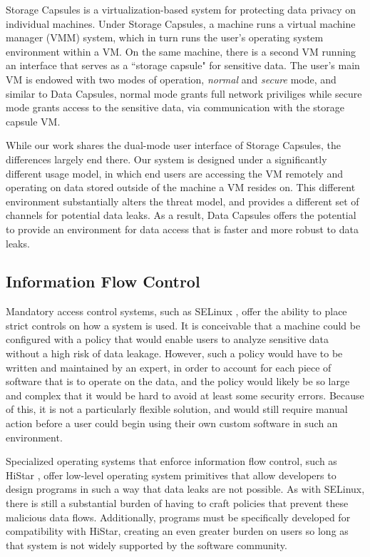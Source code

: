 \documentclass{acm_proc_article-sp}
\begin{document}
Storage Capsules \cite{capsules-borders} is a virtualization-based system for
protecting data privacy on individual machines.  Under Storage Capsules, a
machine runs a virtual machine manager (VMM) system, which in turn runs the
user's operating system environment within a VM.  On the same machine, there is
a second VM running an interface that serves as a ``storage capsule" for
sensitive data.  The user's main VM is endowed with two modes of operation,
\emph{normal} and \emph{secure} mode, and similar to Data Capsules, normal mode
grants full network priviliges while secure mode grants access to the sensitive
data, via communication with the storage capsule VM.

While our work shares the dual-mode user interface of Storage Capsules, the
differences largely end there.  Our system is designed under a significantly
different usage model, in which end users are accessing the VM remotely and
operating on data stored outside of the machine a VM resides on. This different
environment substantially alters the threat model, and provides a different set
of channels for potential data leaks.  As a result, Data Capsules offers the
potential to provide an environment for data access that is faster and more
robust to data leaks.

\subsection{Information Flow Control}

Mandatory access control systems, such as SELinux \cite{selinux}, offer the
ability to place strict controls on how a system is used.  It is conceivable
that a machine could be configured with a policy that would enable users to
analyze sensitive data without a high risk of data leakage.  However, such a
policy would have to be written and maintained by an expert, in order to account
for each piece of software that is to operate on the data, and the policy would
likely be so large and complex that it would be hard to avoid at least some
security errors.  Because of this, it is not a particularly flexible solution,
and would still require manual action before a user could begin using their own
custom software in such an environment.

Specialized operating systems that enforce information flow control, such as
HiStar \cite{histar}, offer low-level operating system primitives that allow
developers to design programs in such a way that data leaks are not possible.
As with SELinux, there is still a substantial burden of having to craft policies
that prevent these malicious data flows.  Additionally, programs must be
specifically developed for compatibility with HiStar, creating an even greater
burden on users so long as that system is not widely supported by the software
community.
\end{document}
